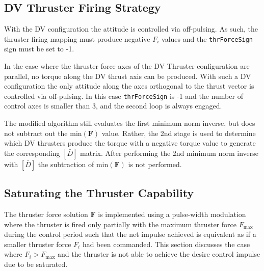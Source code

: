 \subsection{DV Thruster Firing Strategy}
With the DV configuration the attitude is controlled via off-pulsing.  As such, the thruster firing mapping must produce negative $F_{i}$ values and the {\tt thrForceSign} sign must be set to -1.

In the case where the thruster force axes of the DV Thruster configuration are parallel, no torque along the DV thrust axis can be produced. With such a DV configuration the only attitude along the axes orthogonal to the thrust vector is controlled via off-pulsing. In this case {\tt thrForceSign} is -1 and the number of control axes is smaller than 3, and the second loop is always engaged.

The modified algorithm still evaluates the first minimum norm inverse, but does not subtract out the $\text{min}(\bm F)$ value.  Rather, the 2nd stage is used to determine which DV thrusters produce the torque with a negative torque value to generate the corresponding $[\bar D]$ matrix.  After performing the 2nd minimum norm inverse with $[\bar D]$ the subtraction of  $\text{min}(\bm F)$ is not performed.  


\subsection{Saturating the Thruster Capability}
The thruster force solution $\bm F$ is implemented using a pulse-width modulation where the thruster is fired only partially with the maximum thruster force $F_{\text{max}}$ during the control period such that the net impulse achieved is equivalent as if a smaller thruster force $F_{i}$ had been commanded.  This section discusses the case where $F_{i}>F_{\text{max}}$ and the thruster is not able to achieve the desire control impulse due to be saturated.  

